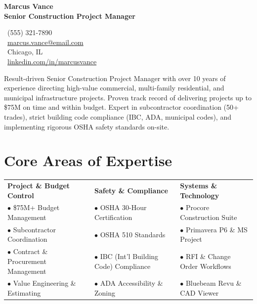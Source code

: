 \documentclass[10pt,letterpaper]{article}
\begin{document}
\color{textcolor}

\begin{tcolorbox}[
  colback=accentcolor!5,
  colframe=accentcolor,
  arc=0mm,
  left=12pt, right=12pt, top=12pt, bottom=12pt,
  sharp corners,
  boxrule=0pt,
  leftrule=4pt
]
  \begin{minipage}[t]{0.60\textwidth}
    {\Huge\bfseries\color{accentcolor} Marcus Vance} \\[6pt]
    {\large\bfseries\color{secondarycolor} Senior Construction Project Manager}
  \end{minipage}%
  \begin{minipage}[t]{0.40\textwidth}
    \raggedleft\small\color{textcolor}
    \faPhone\ (555) 321-7890 \\
    \faEnvelope\ \href{mailto:marcus.vance@email.com}{marcus.vance@email.com} \\
    \faMapMarker\ Chicago, IL \\
    \faLinkedin\ \href{https://linkedin.com}{linkedin.com/in/marcusvance}
  \end{minipage}
\end{tcolorbox}

\vspace{6pt}

\noindent
Result-driven Senior Construction Project Manager with over 10 years of experience directing high-value commercial, multi-family residential, and municipal infrastructure projects. Proven track record of delivering projects up to \$75M on time and within budget. Expert in subcontractor coordination (50+ trades), strict building code compliance (IBC, ADA, municipal codes), and implementing rigorous OSHA safety standards on-site.

\vspace{6pt}

\section*{Core Areas of Expertise}
\noindent
\begin{tabularx}{\textwidth}{@{} X X X @{}}
  \textbf{Project \& Budget Control} & \textbf{Safety \& Compliance} & \textbf{Systems \& Technology} \\
  \small$\bullet$ \$75M+ Budget Management & \small$\bullet$ OSHA 30-Hour Certification & \small$\bullet$ Procore Construction Suite \\
  \small$\bullet$ Subcontractor Coordination & \small$\bullet$ OSHA 510 Standards & \small$\bullet$ Primavera P6 \& MS Project \\
  \small$\bullet$ Contract \& Procurement Management & \small$\bullet$ IBC (Int'l Building Code) Compliance & \small$\bullet$ RFI \& Change Order Workflows \\
  \small$\bullet$ Value Engineering \& Estimating & \small$\bullet$ ADA Accessibility \& Zoning & \small$\bullet$ Bluebeam Revu \& CAD Viewer \\
\end{tabularx}
\end{document}
